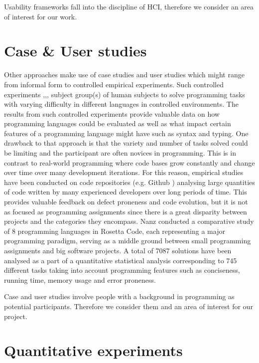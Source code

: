 Usability frameworks fall into the discipline of HCI, therefore we consider an area of interest for our work.		

\section{Case \& User studies}
Other approaches make use of case studies and user studies which might range from informal form to controlled empirical experiments. Such controlled experiments \cite{DynamicTypeSystems},\cite{MulticoreLangs},\cite{EmpiricalComparison}, \cite{Empiricalinvestigation} subject group(s) of human subjects to solve programming tasks with varying difficulty in different languages in controlled environments. The results from such controlled experiments provide valuable data on how programming languages could be evaluated as well as what impact certain features of a programming language might have such as syntax and typing. One drawback to that approach is that the variety and number of tasks solved could be limiting and the participant are often novices in programming. This is in contrast to real-world programming where code bases grow constantly and change over time over many development iterations. For this reason, empirical studies have been conducted on code repositories (e.g. Github \cite{GitHub}) analysing large quantities of code written by many experienced developers  over long periods of time. This provides valuable feedback on defect proneness and code evolution, but it is not as focused as programming assignments since there is a great disparity between projects and the categories they encompass. Nanz \cite{RosettaCode} conducted a comparative study of 8 programming languages in Rosetta Code, each representing a major programming paradigm, serving as a middle ground between small programming assignments and big software projects. A total of 7087 solutions have been analysed as a part of a quantitative statistical analysis corresponding to 745 different tasks taking into account programming features such as conciseness, running time, memory usage and error proneness.

Case and user studies involve people with a background in programming as potential participants. Therefore we consider them and an area of interest for our project.

\section{Quantitative experiments }

